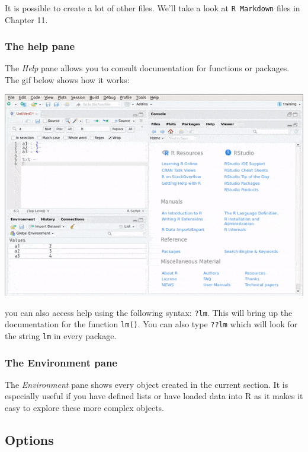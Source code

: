 \documentclass[]{gitbook}
\begin{document}
It is possible to create a lot of other files. We'll take a look at \texttt{R\ Markdown} files in Chapter 11.

\hypertarget{the-help-pane}{%
\subsubsection{The help pane}\label{the-help-pane}}

The \emph{Help} pane allows you to consult documentation for functions or packages. The gif below shows
how it works:

\includegraphics{pics/rstudio_help.gif}

you can also access help using the following syntax: \texttt{?lm}. This will bring up the documentation for
the function \texttt{lm()}. You can also type \texttt{??lm} which will look for the string \texttt{lm} in every package.

\hypertarget{the-environment-pane}{%
\subsubsection{The Environment pane}\label{the-environment-pane}}

The \emph{Environment} pane shows every object created in the current section. It is especially useful
if you have defined lists or have loaded data into R as it makes it easy to explore these more
complex objects.

\hypertarget{options}{%
\subsection{Options}\label{options}}
\end{document}

